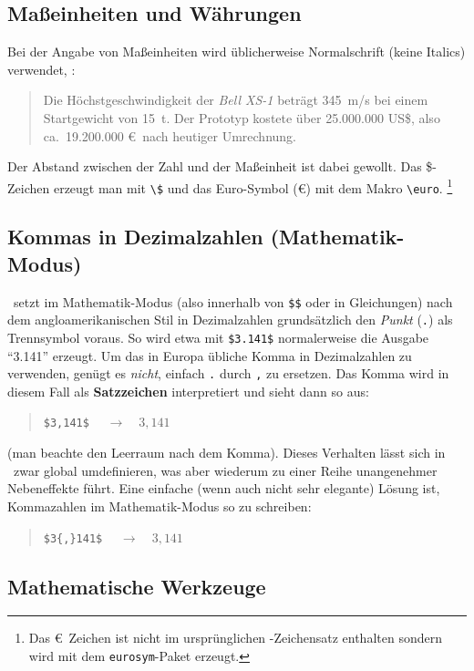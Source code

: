 \subsection{Maßeinheiten und Währungen}

Bei der Angabe von Maßeinheiten wird üblicherweise Normalschrift
(keine Italics) verwendet, \zB:
\begin{quote}
Die Höchstgeschwindigkeit der \textit{Bell XS-1} beträgt 345~m/s
bei einem Startgewicht von 15~t. 
Der Prototyp kostete über 25.000.000 US\$, also ca.\ 19.200.000 \euro\ nach heutiger Umrechnung.
\end{quote}
Der Abstand zwischen der Zahl und der Maßeinheit ist dabei
gewollt.
Das \$-Zeichen erzeugt man mit \verb!\$! und
das Euro-Symbol (\euro) mit dem Makro \verb!\euro!.%
\footnote{Das \euro\ Zeichen ist nicht im ursprünglichen \latex-Zeichensatz enthalten
sondern wird mit dem \texttt{eurosym}-Paket erzeugt.}


\subsection{Kommas in Dezimalzahlen (Mathematik-Modus)}

\latex\ setzt im Mathematik-Modus (also innerhalb von \verb!$$! oder in Gleichungen) nach dem angloamerikanischen Stil in Dezimalzahlen grundsätzlich den \emph{Punkt} (\verb!.!) als Trennsymbol voraus. So wird etwa mit \verb!$3.141$! normalerweise die Ausgabe "`3.141"' erzeugt. Um das in Europa übliche Komma in Dezimalzahlen zu verwenden, genügt es \emph{nicht}, einfach \verb!.! durch \verb!,! zu ersetzen. Das Komma wird in diesem Fall
als \textbf{Satzzeichen} interpretiert und sieht dann so aus:
\begin{quote}
\verb!$3,141$!	$\quad \rightarrow \quad 3,141$ 
\end{quote}
(man beachte den Leerraum nach dem Komma). Dieses Verhalten lässt sich in \latex\ zwar global umdefinieren, was aber wiederum zu einer Reihe unangenehmer Nebeneffekte führt. Eine einfache (wenn auch nicht sehr elegante) Lösung ist, Kommazahlen im Mathematik-Modus so zu schreiben:
\begin{quote}
\verb!$3{,}141$!	$\quad \rightarrow \quad 3{,}141$
\end{quote}



\subsection{Mathematische Werkzeuge}

